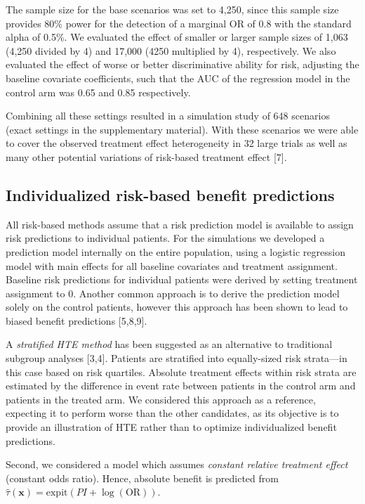 \documentclass[]{elsarticle} %
\begin{document}
The sample size for the base scenarios was set to 4,250, since this
sample size provides \(80\%\) power for the detection of a marginal OR
of 0.8 with the standard alpha of 0.5\%. We evaluated the effect of
smaller or larger sample sizes of 1,063 (4,250 divided by 4) and 17,000
(4250 multiplied by 4), respectively. We also evaluated the effect of
worse or better discriminative ability for risk, adjusting the baseline
covariate coefficients, such that the AUC of the regression model in the
control arm was 0.65 and 0.85 respectively.

Combining all these settings resulted in a simulation study of 648
scenarios (exact settings in the supplementary material). With these
scenarios we were able to cover the observed treatment effect
heterogeneity in 32 large trials as well as many other potential
variations of risk-based treatment effect {[}7{]}.

\hypertarget{individualized-risk-based-benefit-predictions}{%
\subsection{Individualized risk-based benefit
predictions}\label{individualized-risk-based-benefit-predictions}}

All risk-based methods assume that a risk prediction model is available
to assign risk predictions to individual patients. For the simulations
we developed a prediction model internally on the entire population,
using a logistic regression model with main effects for all baseline
covariates and treatment assignment. Baseline risk predictions for
individual patients were derived by setting treatment assignment to 0.
Another common approach is to derive the prediction model solely on the
control patients, however this approach has been shown to lead to biased
benefit predictions {[}5,8,9{]}.

A \emph{stratified HTE method} has been suggested as an alternative to
traditional subgroup analyses {[}3,4{]}. Patients are stratified into
equally-sized risk strata---in this case based on risk quartiles.
Absolute treatment effects within risk strata are estimated by the
difference in event rate between patients in the control arm and
patients in the treated arm. We considered this approach as a reference,
expecting it to perform worse than the other candidates, as its
objective is to provide an illustration of HTE rather than to optimize
individualized benefit predictions.

Second, we considered a model which assumes \emph{constant relative
treatment effect} (constant odds ratio). Hence, absolute benefit is
predicted from
\(\hat{\tau}(\bm{x}) = \text{expit}(PI +\log(\text{OR}))\).
\end{document}
